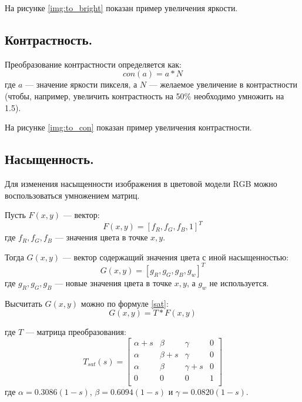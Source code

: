 На рисунке \ref{img:to_bright} показан пример увеличения яркости.


\subsection{Контрастность.}

Преобразование контрастности определяется как:
\begin{equation}
	\label{contrast}
	con(a) = a * N
\end{equation}
где $a$ --- значение яркости пикселя, а $N$ --- желаемое увеличение в контрастности (чтобы, например, увеличить контрастность на 50\% необходимо умножить на 1.5). \cite{brk}

На рисунке \ref{img:to_con} показан пример увеличения контрастности.


\subsection{Насыщенность.}

Для изменения насыщенности изображения в цветовой модели RGB можно воспользоваться умножением матриц.

Пусть $F(x,y)$ --- вектор:
\begin{equation}
	\label{F}
	F(x,y) = [f_R, f_G, f_B, 1]^T
\end{equation}
где $f_R, f_G, f_B$ --- значения цвета в точке $x,y$.

Тогда $G(x,y)$ --- вектор содержащий значения цвета с иной насыщенностью:
\begin{equation}
	\label{G}
	G(x,y) = [g_R, g_G, g_B, g_w]^T
\end{equation}
где $g_R, g_G, g_B$ --- новые значения цвета в точке $x,y$, а $g_w$ не используется.

Высчитать $G(x,y)$ можно по формуле \ref{sat}:
\begin{equation}
	\label{sat}
	G(x,y) = T * F(x,y)
\end{equation}

где $T$ --- матрица преобразования:
\begin{equation}
	\label{tsat}
	T_{sat}(s) = \begin{bmatrix}
					\alpha + s & \beta & \gamma & 0\\
				    \alpha & \beta + s & \gamma & 0 \\ 
					\alpha & \beta & \gamma + s & 0 \\ 
					0 & 0 & 0 & 1 \\ 
				\end{bmatrix}
\end{equation}
где $\alpha = 0.3086(1 - s)$, $\beta = 0.6094(1 - s)$ и $\gamma = 0.0820(1 - s)$.

